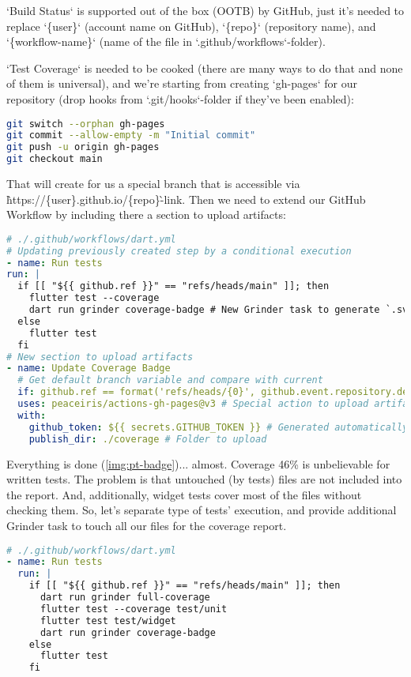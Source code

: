 `Build Status` is supported out of the box (OOTB) by GitHub, just it's needed to replace `\{user\}` (account name
on GitHub), `\{repo\}` (repository name), and `\{workflow-name\}` (name of the file in `.github/workflows`-folder).

`Test Coverage` is needed to be cooked (there are many ways to do that and none of them is universal), and we're 
starting from creating `gh-pages` for our repository (drop hooks from `.git/hooks`-folder if they've been enabled):

\begin{lstlisting}[language=bash]
git switch --orphan gh-pages
git commit --allow-empty -m "Initial commit"
git push -u origin gh-pages
git checkout main
\end{lstlisting}

\noindent That will create for us a special branch that is accessible via \`https://\{user\}.github.io/\{repo\}\`-link. 
Then we need to extend our GitHub Workflow by including there a section to upload artifacts:

\begin{lstlisting}[language=yaml]
# ./.github/workflows/dart.yml
# Updating previously created step by a conditional execution
- name: Run tests
run: |
  if [[ "${{ github.ref }}" == "refs/heads/main" ]]; then
    flutter test --coverage
    dart run grinder coverage-badge # New Grinder task to generate `.svg'-file with coverage
  else
    flutter test
  fi
# New section to upload artifacts
- name: Update Coverage Badge
  # Get default branch variable and compare with current
  if: github.ref == format('refs/heads/{0}', github.event.repository.default_branch)
  uses: peaceiris/actions-gh-pages@v3 # Special action to upload artifacts
  with:
    github_token: ${{ secrets.GITHUB_TOKEN }} # Generated automatically by GitHub
    publish_dir: ./coverage # Folder to upload
\end{lstlisting}


Everything is done (\cref{img:pt-badge})... almost. Coverage 46\% is unbelievable for written tests. The problem is 
that untouched (by tests) files are not included into the report. And, additionally, widget tests cover most of the 
files without checking them. So, let's separate type of tests' execution, and provide additional Grinder task to 
touch all our files for the coverage report.

\begin{lstlisting}[language=yaml]
# ./.github/workflows/dart.yml
- name: Run tests
  run: |
    if [[ "${{ github.ref }}" == "refs/heads/main" ]]; then
      dart run grinder full-coverage
      flutter test --coverage test/unit
      flutter test test/widget
      dart run grinder coverage-badge
    else
      flutter test
    fi
\end{lstlisting}

